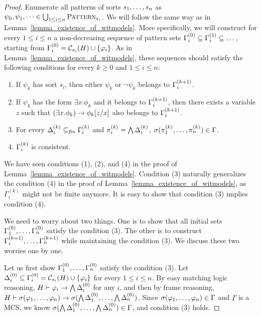 \documentclass{amsart}
\begin{document}
\begin{proof}
Enumerate all patterns of sorts $s_1 ,\dots, s_n$
as $\psi_0,\psi_1,\dots \in \bigcup_{1 \le i \le n} \textnormal{\textsc{Pattern}}_{s_i}$.
We will follow the same way as in
Lemma~\ref{lemma_existence_of_witmodels}.
More specifically, we will construct for every $1 \le i \le n$
a non-decreasing sequence of pattern sets
$\Gamma_i^{(0)} \subseteq \Gamma_i^{(1)} \subseteq \dots$,
starting from $\Gamma_i^{(0)} = \mathcal{C}_{s_i}(H) \cup \{ \varphi_i \}$.
As in Lemma~\ref{lemma_existence_of_witmodels},
these sequences should satisfy the following conditions
for every $k \ge 0$ and $1 \le i \le n$:
\begin{enumerate}
\item If $\psi_k$ has sort $s_i$, 
      then either $\psi_k$ or $\neg \psi_k$ belongs to $\Gamma_i^{(k+1)}$.
\item If $\psi_k$ has the form $\exists x . \phi_k$ and
it belongs to $\Gamma_i^{(k+1)}$, then there exists
a variable $z$ such that
$(\exists x . \phi_k) \to \phi_k[z/x]$ also belongs to 
$\Gamma_i^{(k+1)}$.
\item For every $\Delta_i^{(k)} \subseteq_{\mathit{fin}} \Gamma_i^{(k)}$
            and $\pi_i^{(k)} = \bigwedge \Delta_i^{(k)}$,
            $\sigma(\pi_1^{(k)} ,\dots, \pi_n^{(k)}) \in \Gamma$.
\item $\Gamma_i^{(k)}$ is consistent.
\end{enumerate}

We have seen conditions (1), (2), and (4)
in the proof of Lemma~\ref{lemma_existence_of_witmodels}.
Condition (3) naturally generalizes 
the condition (4) in the proof of Lemma~\ref{lemma_existence_of_witmodels},
as $\Gamma_i^{(k)}$ might not be finite anymore.
It is easy to show that condition (3) implies condition (4).

We need to worry about two things.
One is to show that all initial sets
$\Gamma_1^{(0)} ,\dots, \Gamma_n^{(0)}$ satisfy the condition (3).
The other is to construct 
$\Gamma_i^{(k+1)} ,\dots, \Gamma_n^{(k+1)}$
while maintaining the condition (3).
We discuss these two worries one by one.

Let us first show 
$\Gamma_1^{(0)} ,\dots, \Gamma_n^{(0)}$ satisfy the condition (3).
Let $\Delta_i^{(0)} \subseteq \Gamma_i^{(0)} = \mathcal{C}_{s_i}(H) \cup \{\varphi_i\}$ 
for every $1 \le i \le n$.
By easy matching logic reasoning,
$H \vdash \varphi_i \to \bigwedge \Delta_i^{(0)}$ for any $i$,
and then by frame reasoning,
$H \vdash \sigma(\varphi_1 ,\dots, \varphi_n) 
 \to \sigma(\bigwedge \Delta_1^{(0)} ,\dots, \bigwedge \Delta_n^{(0)})$.
Since $\sigma(\varphi_1 ,\dots, \varphi_n) \in \Gamma$
and $\Gamma$ is a MCS,
we know
$\sigma(\bigwedge \Delta_1^{(0)} ,\dots, \bigwedge \Delta_n^{(0)}) \in \Gamma$,
and condition (3) holds.


\end{proof}
\end{document}
